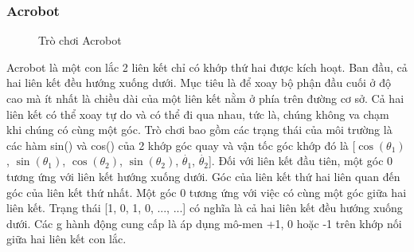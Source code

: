 \subsubsection{Acrobot}
\begin{figure}[h!]
    \centering
    \caption{Trò chơi Acrobot}
    \label{fig:flappybird}
\end{figure}
Acrobot là một con lắc 2 liên kết chỉ có khớp thứ hai được kích hoạt. Ban đầu, cả hai liên kết đều hướng xuống dưới. Mục tiêu là để xoay bộ phận đầu cuối ở độ cao mà ít nhất là chiều dài của một liên kết nằm ở phía trên đường cơ sở. Cả hai liên kết có thể xoay tự do và có thể đi qua nhau, tức là, chúng không va chạm khi chúng có cùng một góc. Trò chơi bao gồm các trạng thái của môi trường là các hàm sin() và cos() của 2 khớp góc quay và vận tốc góc khớp đó là [$\cos(\theta_1)$, $\sin(\theta_1)$, $\cos(\theta_2)$, $\sin(\theta_2)$, $\Dot{\theta_1}$, $\Dot{\theta_2}$]. Đối với liên kết đầu tiên, một góc 0 tương ứng với liên kết hướng xuống dưới. Góc của liên kết thứ hai liên quan đến góc của liên kết thứ nhất. Một góc 0 tương ứng với việc có cùng một góc giữa hai liên kết. Trạng thái [1, 0, 1, 0, ..., ...] có nghĩa là cả hai liên kết đều hướng xuống dưới. Các g
hành động cung cấp là áp dụng mô-men +1, 0 hoặc -1 trên khớp nối giữa hai liên kết con lắc. 

